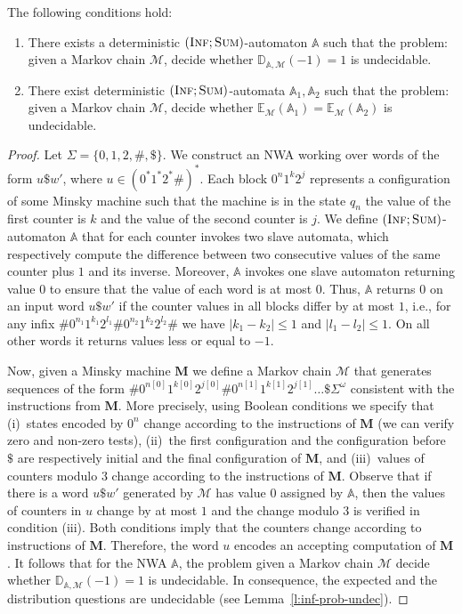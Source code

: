\documentclass{lmcs}
\newcommand{\nestedA}{\mathbb{A}}
\newcommand{\fsum}{\textsc{Sum}}
\newcommand{\finf}{\textsc{Inf}}
\newcommand{\expected}{\mathbb{E}}
\newcommand{\distrib}{\mathbb{D}}
\newcommand{\markov}{\mathcal{M}}
\newcommand{\M}{\mathbf{M}}
\begin{document}
\begin{lem}\label{l:parametric-uncomputable}
The following conditions hold:
\begin{enumerate}
\item There exists a deterministic $(\finf;\fsum)$-automaton $\nestedA$ such that the problem: given a Markov chain $\markov$, decide whether $\distrib_{\nestedA, \markov}(-1) = 1$ is undecidable.
\item There exist  deterministic  $(\finf;\fsum)$-automata $\nestedA_1, \nestedA_2$ such that the problem: given a Markov chain $\markov$, decide whether $\expected_{\markov}(\nestedA_1) = \expected_{\markov}(\nestedA_2)$ is undecidable.
\end{enumerate}
\end{lem}
\begin{proof}
Let $\Sigma = \{ 0,1,2,\#,\$\}$.
We construct an NWA working over words of the form $u \$ w'$, where $u \in {(0^* 1^* 2^* \#)}^*$.
Each block $0^n 1^k 2^j$ represents a configuration of some Minsky machine such that the machine is in the state $q_n$ the value of the first counter is $k$ and the value of the second counter is $j$.
We define $(\finf;\fsum)$-automaton $\nestedA$ that for each counter invokes two slave automata, which respectively compute the difference between two consecutive values of the same counter plus $1$ and its inverse.
Moreover, $\nestedA$ invokes one slave automaton returning value $0$ to ensure that the value of each word is at most $0$.
Thus, $\nestedA$ returns $0$ on an input word $u \$ w'$ if the counter values in all blocks differ by at most $1$, i.e., for any infix $\# 0^{n_1} 1^{k_1} 2^{l_1} \# 0^{n_2} 1^{k_2} 2^{l_2} \#$ we have $|k_1 - k_2 | \leq 1$ and $|l_1 - l_2| \leq 1$.
On all other words it returns values less or equal to $-1$.

Now, given a Minsky machine $\M$ we define a Markov chain $\markov$ that generates sequences of the form $\# 0^{n[0]} 1^{k[0]} 2^{j[0]} \# 0^{n[1]} 1^{k[1]} 2^{j[1]} \ldots \$ \Sigma^{\omega}$ consistent with the instructions from $\M$.
More precisely, using Boolean conditions we specify that
(i)~states encoded by $0^{n}$ change according to the instructions of $\M$ (we can verify zero and non-zero tests),
(ii)~the first configuration and the configuration before $\$$ are respectively initial and the final configuration of $\M$, and
(iii)~values of counters modulo $3$ change according to the instructions of $\M$.
Observe that if there is a word $u \$ w'$ generated by $\markov$ has value $0$ assigned by $\nestedA$, then the values of counters in $u$ change by at most $1$ and the change modulo $3$ is verified in condition (iii).
Both conditions imply that the counters change according to instructions of $\M$.
Therefore, the word $u$ encodes an accepting computation of $\M$.
It follows that for the NWA $\nestedA$, the problem given a Markov chain $\markov$ decide whether $\distrib_{\nestedA, \markov}(-1) = 1$ is undecidable.
In consequence, the expected and the distribution questions are undecidable (see Lemma~\ref{l:inf-prob-undec}).


\end{proof}
\end{document}
